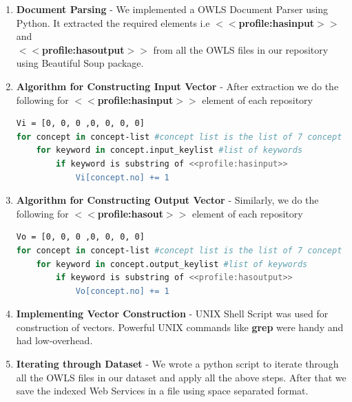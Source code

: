 \documentclass[12pt, oneside]{book}
\begin{document}
\begin{enumerate}
 \item \textbf{Document Parsing} - We implemented a OWLS Document Parser using Python. It extracted the required elements i.e \textbf{$<<$profile:hasinput$>>$} and \\ \textbf{$<<$profile:hasoutput$>>$} from all the OWLS files in our repository using Beautiful Soup package.
   \item \textbf{Algorithm for Constructing Input Vector} - After extraction we do the following for \textbf{$<<$profile:hasinput$>>$} element of each repository
   \begin{lstlisting}[language = bash, style = mystyle]
Vi = [0, 0, 0 ,0, 0, 0, 0]
for concept in concept-list #concept list is the list of 7 concept
	for keyword in concept.input_keylist #list of keywords
		if keyword is substring of <<profile:hasinput>>
			Vi[concept.no] += 1\end{lstlisting}
	\item \textbf{Algorithm for Constructing Output Vector} - Similarly, we do the following for \textbf{$<<$profile:hasout$>>$} element of each repository
   \begin{lstlisting}[language = bash, style = mystyle]
Vo = [0, 0, 0 ,0, 0, 0, 0]
for concept in concept-list #concept list is the list of 7 concept
	for keyword in concept.output_keylist #list of keywords
		if keyword is substring of <<profile:hasoutput>>
			Vo[concept.no] += 1 \end{lstlisting}
	\item \textbf{Implementing Vector Construction} -  UNIX Shell Script was used for construction of vectors. Powerful UNIX commands like \textbf{grep} were handy and had low-overhead.
	\item \textbf{Iterating through Dataset} - We wrote a python script to iterate through all the OWLS files in our dataset and apply all the above steps. After that we save the indexed Web Services in a file using space separated format.
\end{enumerate}
\end{document}
